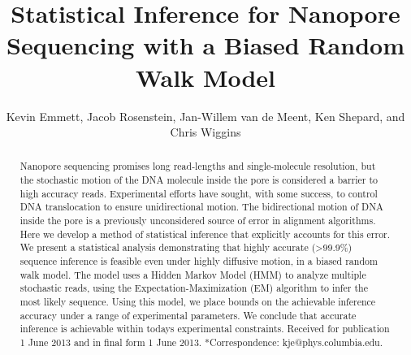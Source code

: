 \documentclass{biophys_letter}
\begin{document}
\setcounter{page}{1} %
\title{Statistical Inference for Nanopore Sequencing with a Biased Random Walk Model}

\author{Kevin Emmett,{\authdag *} Jacob Rosenstein,{\authpar} Jan-Willem van de Meent,{\authddag} Ken Shepard,{\addrS} and Chris Wiggins{\authddag}}

\address{{\addrdag}Department of Physics and {\addrddag}Department of Applied Physics and Applied Math and {\addrS}Department of Electrical Engineering, Columbia University, New York, New York; and {\addrpar}School of Engineering, Brown University, Providence, Rhode Island}

\pagestyle{headings}

\maketitle



\begin{abstract}
    {Nanopore sequencing promises long read-lengths and single-molecule resolution, but the stochastic motion of the DNA molecule inside the pore is considered a barrier to high accuracy reads.
    Experimental efforts have sought, with some success, to control DNA translocation to ensure unidirectional motion.
    The bidirectional motion of DNA inside the pore is a previously unconsidered source of error in alignment algorithms.
    Here we develop a method of statistical inference that explicitly accounts for this error.
    We present a statistical analysis demonstrating that highly accurate (\textgreater 99.9\%) sequence inference is feasible even under highly diffusive motion, in a biased random walk model.
    The model uses a Hidden Markov Model (HMM) to analyze multiple stochastic reads, using the Expectation-Maximization (EM) algorithm to infer the most likely sequence.
    Using this model, we place bounds on the achievable inference accuracy under a range of experimental parameters.
    We conclude that accurate inference is achievable within todays experimental constraints.}
    {Received for publication 1 June 2013 and in final form 1 June 2013.}
    {*Correspondence: kje@phys.columbia.edu.}
\end{abstract}
\end{document}
